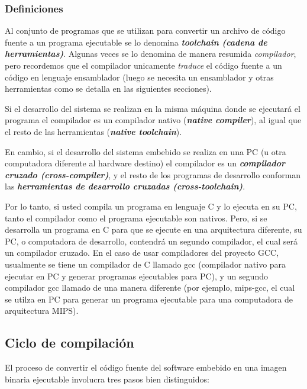 \documentclass[output=paper, 
colorlinks,
citecolor=brown,
newtxmath
]{langscibook}
\begin{document}
\subsubsection{Definiciones}

Al conjunto de programas que se utilizan para convertir un
archivo de código fuente a un programa ejecutable se lo denomina
\textit{\textbf{toolchain (cadena de herramientas)}}. Algunas veces
se lo denomina de manera resumida \textit{compilador}, pero recordemos
que el compilador unicamente \textit{traduce} el código fuente 
a un código en lenguaje ensamblador (luego se necesita un ensamblador
y otras herramientas como se detalla en las siguientes secciones).

Si el desarrollo del sistema se realizan en la misma máquina
donde se ejecutará el programa el compilador es un compilador nativo 
(\textit{\textbf{native compiler}}),
al igual que el resto de las herramientas 
(\textit{\textbf{native toolchain}}).

En cambio, si el desarrollo del sistema embebido se realiza en una PC
(u otra computadora diferente al hardware destino) el compilador
es un \textit{\textbf{compilador cruzado (cross-compiler)}}, y el resto
de los programas de desarrollo conforman las \textit{\textbf{herramientas
de desarrollo cruzadas (cross-toolchain)}}.

Por lo tanto, si usted compila un programa en lenguaje C y lo ejecuta
en su PC, tanto el compilador como el programa ejecutable son nativos.
Pero, si se desarrolla un programa en C para que se ejecute
en una arquitectura diferente, su PC, o computadora de desarrollo,
contendrá un segundo compilador, el cual será un compilador cruzado.
En el caso de usar compiladores del proyecto GCC, usualmente 
se tiene un compilador de C llamado gcc (compilador nativo para ejecutar
en PC y generar programas ejecutables para PC), y un segundo compilador
gcc llamado de una manera diferente (por ejemplo, mips-gcc, el cual
se utilza en PC para generar un programa ejecutable para una computadora
de arquitectura MIPS).

\subsection{Ciclo de compilación}

El proceso de convertir el código fuente del software embebido
en una imagen binaria ejecutable involucra tres pasos bien distinguidos:
\end{document}
